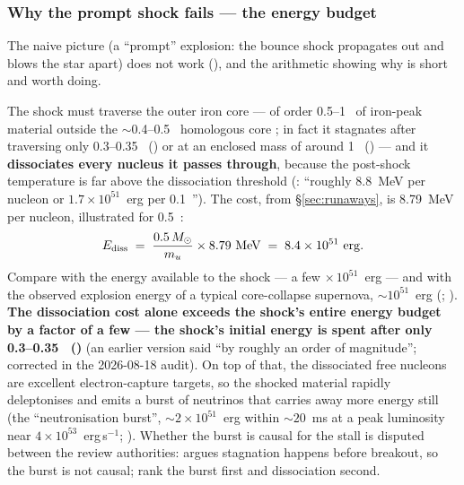 \subsubsection{Why the prompt shock fails --- the energy budget}
\label{sec:promptshock}

The naive picture (a ``prompt'' explosion: the bounce shock propagates out and
blows the star apart) does not work (\citealt{janka2012, janka2017}), and the
arithmetic showing why is short and worth doing.

The shock must traverse the outer iron core --- of order 0.5--1~\Msun{} of
iron-peak material outside the $\sim$0.4--0.5~\Msun{} homologous core
\typical[Janka 2012, 2017]; in fact it stagnates after traversing only
0.3--0.35~\Msun{} (\citealt{janka2012}) or at an enclosed mass of around
1~\Msun{} (\citealt{janka2017}) --- and it \textbf{dissociates every nucleus it
passes through}, because the post-shock temperature is far above the
dissociation threshold (\citealt{janka2017}: ``roughly 8.8~MeV per nucleon or
$1.7 \times 10^{51}$~erg per 0.1~\Msun''). The cost, from
\S\ref{sec:runaways}, is 8.79~MeV per nucleon, illustrated for 0.5~\Msun:
%
\begin{equation}
E_{\mathrm{diss}} \;=\; \frac{0.5\,M_{\odot}}{m_u}\times 8.79\ \mathrm{MeV}
\;=\; 8.4\times10^{51}\ \mathrm{erg}.
\label{eq:ediss}
\end{equation}
%
\derivedhere{} Compare with the energy available to the shock --- a few
$\times\,10^{51}$~erg  --- and with the observed
explosion energy of a typical core-collapse supernova, $\sim 10^{51}$~erg
(\citealt{burrows2021}; \citealt{woosley2007}). \textbf{The dissociation cost
alone exceeds the shock's entire energy budget by a factor of a few --- the
shock's initial energy is spent after only 0.3--0.35~\Msun{}
(\citealt{janka2012})} (an earlier version said ``by roughly an order of
magnitude''; corrected in the 2026-08-18 audit). On top of that, the
dissociated free nucleons are excellent electron-capture targets, so the
shocked material rapidly deleptonises and emits a burst of neutrinos that
carries away more energy still (the ``neutronisation burst'',
$\sim 2 \times 10^{51}$~erg within $\sim 20$~ms at a peak luminosity near
$4 \times 10^{53}$~erg\,s$^{-1}$; \citealt{janka2017}). Whether the burst is
causal for the stall is disputed between the review authorities:
\citet{janka2012} argues stagnation happens before breakout, so the burst is
not causal; \citet{burrows2021} rank the burst first and dissociation second.

